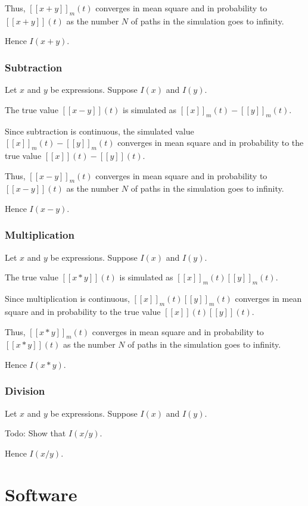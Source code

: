 \documentclass[a4paper,11pt]{article}
\newcommand{\sembrack}[1]{[\![#1]\!]}
\begin{document}
Thus, $\sembrack{x + y}_m(t)$ converges in mean square and in probability to $\sembrack{x + y}(t)$ as the number $N$ of paths in the simulation goes to infinity.
  
Hence $I(x + y)$.

\subsubsection{Subtraction}
Let $x$ and $y$ be expressions. Suppose $I(x)$ and $I(y)$.

The true value $\sembrack{x - y}(t)$ is simulated as $ \sembrack{x}_m(t) - \sembrack{y}_m(t) $.

Since subtraction is continuous, the simulated value $\sembrack{x}_m(t) - \sembrack{y}_m(t)$ converges in mean square and in probability to the true value $\sembrack{x}(t) - \sembrack{y}(t)$.

Thus, $\sembrack{x - y}_m(t)$ converges in mean square and in probability to $\sembrack{x - y}(t)$ as the number $N$ of paths in the simulation goes to infinity.
  
Hence $I(x - y)$.


\subsubsection{Multiplication}
Let $x$ and $y$ be expressions. Suppose $I(x)$ and $I(y)$.

The true value $\sembrack{x * y}(t)$ is simulated as $ \sembrack{x}_m(t) \sembrack{y}_m(t) $.

Since multiplication is continuous, $\sembrack{x}_m(t) \sembrack{y}_m(t)$ converges in mean square and in probability to the true value $\sembrack{x}(t) \sembrack{y}(t)$.

Thus, $\sembrack{x * y}_m(t)$ converges in mean square and in probability to $\sembrack{x * y}(t)$ as the number $N$ of paths in the simulation goes to infinity.
  
Hence $I(x * y)$.

\subsubsection{Division}
Let $x$ and $y$ be expressions. Suppose $I(x)$ and $I(y)$.

Todo: Show that $I(x / y)$. 

Hence $I(x / y)$.


\section{Software}
\end{document}
